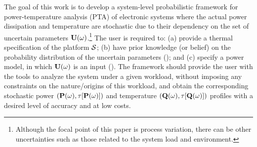 The goal of this work is to develop a system-level probabilistic framework for power-temperature analysis (PTA) of electronic systems where the actual power dissipation and temperature are stochastic due to their dependency on the set of uncertain parameters $\mathbf{U}(\omega)$.\footnote{Although the focal point of this paper is process variation, there can be other uncertainties such as those related to the system load and environment.}
The user is required to: (a) provide a thermal specification of the platform $\mathcal{S}$; (b) have prior knowledge (or belief) on the probability distribution of the uncertain parameters (); and (c) specify a power model, in which $\mathbf{U}(\omega)$ is an input ().
The framework should provide the user with the tools to analyze the system under a given workload, without imposing any constraints on the nature/origins of this workload, and obtain the corresponding stochastic power $\profileP{\o}$ and temperature $\profileT{\o}$ profiles with a desired level of accuracy and at low costs.
